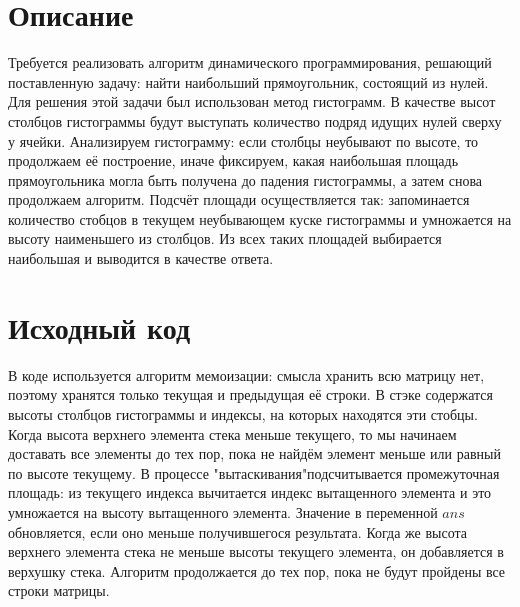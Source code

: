 \section{Описание}
Требуется реализовать алгоритм динамического программирования, решающий поставленную задачу: найти наибольший прямоугольник, состоящий из нулей. Для решения этой задачи был использован метод гистограмм. В качестве высот столбцов гистограммы будут выступать количество подряд идущих нулей сверху у ячейки. Анализируем гистограмму: если столбцы неубывают по высоте, то продолжаем её построение, иначе фиксируем, какая наибольшая площадь прямоугольника могла быть получена до падения гистограммы, а затем снова продолжаем алгоритм. Подсчёт площади осуществляется так: запоминается количество стобцов в текущем неубывающем куске гистограммы и умножается на высоту наименьшего из столбцов. Из всех таких площадей выбирается наибольшая и выводится в качестве ответа.

\pagebreak

\section{Исходный код}
В коде используется алгоритм мемоизации: смысла хранить всю матрицу нет, поэтому хранятся только текущая и предыдущая её строки. В стэке содержатся высоты столбцов гистограммы и индексы, на которых находятся эти стобцы. Когда высота верхнего элемента стека меньше текущего, то мы начинаем доставать все элементы до тех пор, пока не найдём элемент меньше или равный по высоте текущему. В процессе "вытаскивания" подсчитывается промежуточная площадь: из текущего индекса вычитается индекс вытащенного элемента и это умножается на высоту вытащенного элемента. Значение в переменной $ans$ обновляется, если оно меньше получившегося результата. 
Когда же высота верхнего элемента стека не меньше высоты текущего элемента, он добавляется в верхушку стека.
Алгоритм продолжается до тех пор, пока не будут пройдены все строки матрицы.

